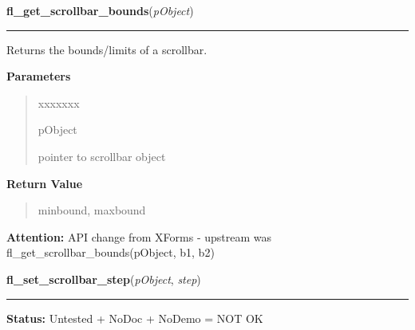 \hspace{.8\funcindent}\begin{boxedminipage}{\funcwidth}

    \raggedright \textbf{fl\_get\_scrollbar\_bounds}(\textit{pObject})

    \vspace{-1.5ex}

    \rule{\textwidth}{0.5\fboxrule}
\setlength{\parskip}{2ex}
    Returns the bounds/limits of a scrollbar.

\setlength{\parskip}{1ex}
      \textbf{Parameters}
      \vspace{-1ex}

      \begin{quote}
        \begin{Ventry}{xxxxxxx}

          \item[pObject]

          pointer to scrollbar object

        \end{Ventry}

      \end{quote}

      \textbf{Return Value}
    \vspace{-1ex}

      \begin{quote}
      minbound, maxbound

      \end{quote}

\textbf{Attention:} API change from XForms - upstream was fl\_get\_scrollbar\_bounds(pObject, 
b1, b2)



    \end{boxedminipage}

    \label{xformslib:library:fl_set_scrollbar_step}

    \vspace{0.5ex}

\hspace{.8\funcindent}\begin{boxedminipage}{\funcwidth}

    \raggedright \textbf{fl\_set\_scrollbar\_step}(\textit{pObject}, \textit{step})

    \vspace{-1.5ex}

    \rule{\textwidth}{0.5\fboxrule}
\setlength{\parskip}{2ex}
\setlength{\parskip}{1ex}
\textbf{Status:} Untested + NoDoc + NoDemo = NOT OK



    \end{boxedminipage}


